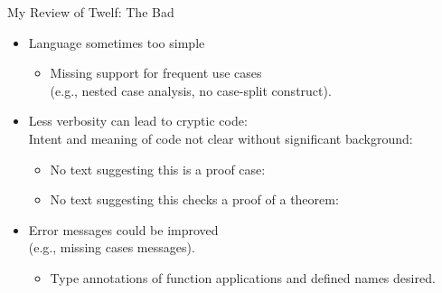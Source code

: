 \documentclass{beamer}
\begin{document}
\begin{frame}[containsverbatim]{My Review of Twelf:  The Bad}
\begin{itemize}
\item Language sometimes too simple
	\begin{itemize}
		\item Missing support for frequent use cases \\
		(e.g., nested case analysis, no case-split construct).
	\end{itemize}
\item Less verbosity can lead to cryptic code: \\
Intent and meaning of code not clear without significant background:
	\begin{itemize}
	\item No text suggesting this is a proof case:
	
\begin{alltt}
\end{alltt}
	
	\item No text suggesting this checks a proof of a theorem:
	
\begin{alltt}
\end{alltt}
	\end{itemize}
\item Error messages could be improved \\
(e.g., missing cases messages).
	\begin{itemize}
	\item Type annotations of function applications and defined names desired.
	\end{itemize}
\end{itemize}
\end{frame}
\end{document}
